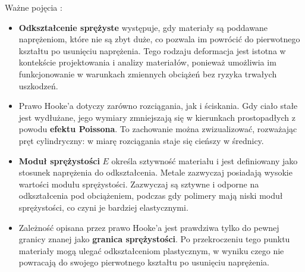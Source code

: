 \clearpage
 Ważne pojęcia \cite{kittel1976wstep, alma991053253943408832}:
\begin{itemize}
    \item {\textbf{Odkształcenie sprężyste} występuje, gdy materiały są poddawane naprężeniom, które nie są zbyt duże, co pozwala im powrócić do pierwotnego kształtu po usunięciu naprężenia. Tego rodzaju deformacja jest istotna w kontekście projektowania i analizy materiałów, ponieważ umożliwia im funkcjonowanie w warunkach zmiennych obciążeń bez ryzyka trwałych uszkodzeń.}
    
    \item {Prawo Hooke'a dotyczy zarówno rozciągania, jak i ściskania. Gdy ciało stałe jest wydłużane, jego wymiary zmniejszają się w kierunkach prostopadłych z powodu \textbf{efektu Poissona}. To zachowanie można zwizualizować, rozważając pręt cylindryczny: w miarę rozciągania staje się cieńszy w średnicy.}

    \item {\textbf{Moduł sprężystości} $E$ określa sztywność materiału i jest definiowany jako stosunek naprężenia do odkształcenia. Metale zazwyczaj posiadają wysokie wartości modułu sprężystości. Zazwyczaj są sztywne i odporne na odkształcenia pod obciążeniem, podczas gdy polimery mają niski moduł sprężystości, co czyni je bardziej elastycznymi.}

    \item {Zależność opisana przez prawo Hooke'a jest prawdziwa tylko do pewnej granicy znanej jako \textbf{granica sprężystości}. Po przekroczeniu tego punktu materiały mogą ulegać odkształceniom plastycznym, w wyniku czego nie powracają do swojego pierwotnego kształtu po usunięciu naprężenia.}
    
\end{itemize}




\noindent\makebox[\linewidth]{\rule{\paperwidth}{0.4pt}}